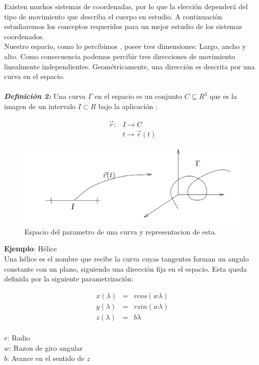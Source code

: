 \documentclass[12pt]{report}
\begin{document}
Existen muchos sistemas de coordenadas, por lo que la elección dependerá del tipo de movimiento que describa el cuerpo en estudio. A continuación estudiaremos los conceptos requeridos para un mejor estudio de los sistemas coordenados. \\

Nuestro espacio, como lo percibimos , posee tres dimensiones: Largo, ancho y alto. Como consecuencia podemos percibir tres direcciones de movimiento linealmente independientes. Geométricamente, una dirección es descrita por una curva en el espacio. \\
\\
 


\textbf{\textit{Definición 2:}} Una curva $\Gamma$ en el espacio es un conjunto $C\subseteq R^3$ que es la imagen de un intervalo $I\subset R$ bajo la aplicación :

\begin{eqnarray}\label{2.1}
\vec{r}:&I\longrightarrow  C \\         %
\nonumber
& t \longrightarrow \vec{r}(t)
\end{eqnarray}


\begin{figure}[H]
	\centering
	\includegraphics[width=14cm]{figura1.png}
	\caption{ Espacio del parametro de una curva y representacion de esta.}
	\label{fig.1}
\end{figure}

\textbf{Ejemplo}: Hélice \\

Una hélice es el nombre que recibe la curva cuyas tangentes forman un angulo constante con un plano, siguiendo una dirección fija en el espacio. Esta queda definida por la siguiente parametrización: 

\begin{eqnarray}\label{2.2}
\nonumber
x(\lambda)&=& rcos(w\lambda)\\
y(\lambda)&=& rsin(w\lambda)\\
\nonumber
z(\lambda)&=& b\lambda
\end{eqnarray}
\\
$r$: Radio \\	
$w$: Razon de giro angular \\
$b$: Avance en el sentido de $z$
\end{document}
